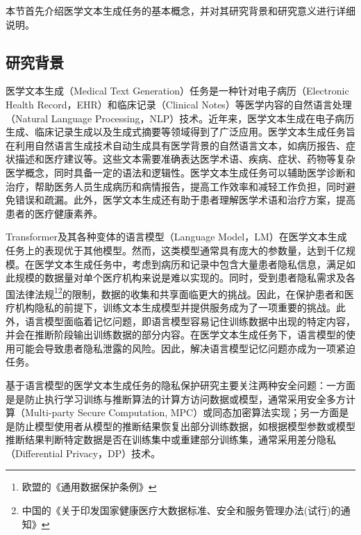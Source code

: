 


本节首先介绍医学文本生成任务的基本概念，并对其研究背景和研究意义进行详细说明。

\subsection{研究背景}

医学文本生成（Medical Text Generation）任务是一种针对电子病历（Electronic Health Record，EHR）和临床记录（Clinical Notes）等医学内容的自然语言处理（Natural Language Processing，NLP）技术。近年来，医学文本生成在电子病历生成\cite{EHR_Generation}、临床记录生成\cite{CN_Generation}以及生成式摘要\cite{Medical_Text_Generation_Summary_CN}等领域得到了广泛应用。医学文本生成任务旨在利用自然语言生成技术自动生成具有医学背景的自然语言文本，如病历报告、症状描述和医疗建议等。这些文本需要准确表达医学术语、疾病、症状、药物等复杂医学概念，同时具备一定的语法和逻辑性。医学文本生成任务可以辅助医学诊断和治疗，帮助医务人员生成病历和病情报告，提高工作效率和减轻工作负担，同时避免错误和疏漏。此外，医学文本生成还有助于患者理解医学术语和治疗方案，提高患者的医疗健康素养。

Transformer\cite{Attn_is_all_you_need}及其各种变体\cite{BERT, GPT2, GPT3}的语言模型（Language Model，LM）在医学文本生成任务上的表现优于其他模型。然而，这类模型通常具有庞大的参数量，达到千亿规模。在医学文本生成任务中，考虑到病历和记录中包含大量患者隐私信息，满足如此规模的数据量对单个医疗机构来说是难以实现的。同时，受到患者隐私需求及各国法律法规\footnote{欧盟的《通用数据保护条例》}\footnote{中国的《关于印发国家健康医疗大数据标准、安全和服务管理办法(试行)的通知》}的限制，数据的收集和共享面临更大的挑战。因此，在保护患者和医疗机构隐私的前提下，训练文本生成模型并提供服务成为了一项重要的挑战。此外，语言模型面临着记忆问题，即语言模型容易记住训练数据中出现的特定内容，并会在推断阶段输出训练数据的部分内容。在医学文本生成任务下，语言模型的使用可能会导致患者隐私泄露的风险。因此，解决语言模型记忆问题亦成为一项紧迫任务。

基于语言模型的医学文本生成任务的隐私保护研究主要关注两种安全问题：一方面是是防止执行学习训练与推断算法的计算方访问数据或模型，通常采用安全多方计算（Multi-party Secure Computation, MPC）或同态加密算法实现；另一方面是是防止模型使用者从模型的推断结果恢复出部分训练数据，如根据模型参数或模型推断结果判断特定数据是否在训练集中或重建部分训练集，通常采用差分隐私（Differential Privacy，DP）技术。

